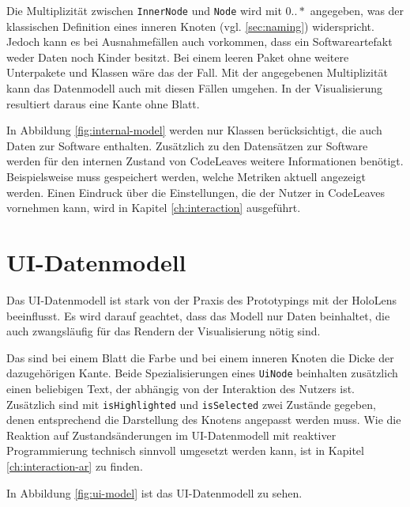 Die Multiplizität zwischen \texttt{InnerNode} und \texttt{Node} wird mit $0..*$ angegeben, was der klassischen Definition eines inneren Knoten (vgl. \ref{sec:naming}) widerspricht. Jedoch kann es bei Ausnahmefällen auch vorkommen, dass ein Softwareartefakt weder Daten noch Kinder besitzt. Bei einem leeren Paket ohne weitere Unterpakete und Klassen wäre das der Fall. Mit der angegebenen Multiplizität kann das Datenmodell auch mit diesen Fällen umgehen. In der Visualisierung resultiert daraus eine Kante ohne Blatt.

In Abbildung \ref{fig:internal-model} werden nur Klassen berücksichtigt, die auch Daten zur Software enthalten. Zusätzlich zu den Datensätzen zur Software werden für den internen Zustand von CodeLeaves weitere Informationen benötigt. Beispielsweise muss gespeichert werden, welche Metriken aktuell angezeigt werden. Einen Eindruck über die Einstellungen, die der Nutzer in CodeLeaves vornehmen kann, wird in Kapitel \ref{ch:interaction} ausgeführt.


\section{UI-Datenmodell}
\label{sec:hierarchical-model}

Das UI-Datenmodell ist stark von der Praxis des Prototypings mit der HoloLens beeinflusst. Es wird darauf geachtet, dass das Modell nur Daten beinhaltet, die auch zwangsläufig für das Rendern der Visualisierung nötig sind.

Das sind bei einem Blatt die Farbe und bei einem inneren Knoten die Dicke der dazugehörigen Kante. Beide Spezialisierungen eines \texttt{UiNode} beinhalten zusätzlich einen beliebigen Text, der abhängig von der Interaktion des Nutzers ist. Zusätzlich sind mit \texttt{isHighlighted} und \texttt{isSelected} zwei Zustände gegeben, denen entsprechend die Darstellung des Knotens angepasst werden muss. Wie die Reaktion auf Zustandsänderungen im UI-Datenmodell mit reaktiver Programmierung technisch sinnvoll umgesetzt werden kann, ist in Kapitel \ref{ch:interaction-ar} zu finden.

In Abbildung \ref{fig:ui-model} ist das UI-Datenmodell zu sehen.


